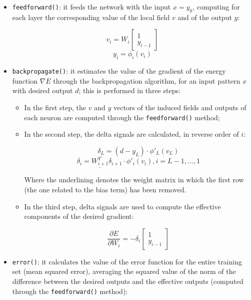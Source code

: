 \documentclass[letterpaper,headings=standardclasses]{scrartcl}
\begin{document}
\begin{itemize}

    \item \texttt{feedforward()}: it feeds the network with the input $x = y_0$, computing for each layer the corresponding value of the local field $v$ and of the output $y$:
    
    $$ v_i = W_i \left[ \begin{matrix} 1 \\ y_{i - 1} \end{matrix} \right] $$
    $$ y_i = \phi_i(v_i) $$
    
    \item \texttt{backpropagate()}: it estimates the value of the gradient of the energy function $\nabla E$ through the backpropagation algorithm, for an input pattern $x$ with desired output $d$; this is performed in three steps:
    
    \begin{itemize}

        \item In the first step, the $v$ and $y$ vectors of the induced fields and outputs of each neuron are computed through the \texttt{feedforward()} method;

        \item In the second step, the delta signals are calculated, in reverse order of $i$:
        
        $$ \delta_L = (d - y_L) \cdot \phi'_L(v_L) $$
        $$ \delta_i = \underline{W_{i + 1}^T} \delta_{i + 1} \cdot \phi'_i(v_i), i = L - 1, \dots, 1 $$

        Where the underlining denotes the weight matrix in which the first row (the one related to the bias term) has been removed.

        \item In the third step, delta signals are used to compute the effective components of the desired gradient:
        
        $$ \frac{\partial E}{\partial W_i} = -\delta_i \left[ \begin{matrix} 1 \\ y_{i - 1} \end{matrix} \right] $$

    \end{itemize}
    
    \item \texttt{error()}: it calculates the value of the error function for the entire training set (mean squared error), averaging the squared value of the norm of the difference between the desired outputs and the effective outputs (computed through the \texttt{feedforward()} method):
    

\end{itemize}
\end{document}
